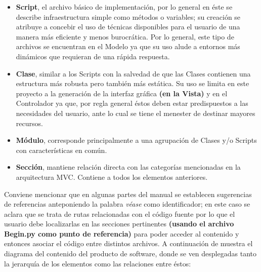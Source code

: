 \documentclass[12pt,twoside]{article}
\begin{document}
\begin{itemize}
\item \textbf{Script}, el archivo básico de implementación, por lo general en 
éste se describe infraestructura simple como métodos o variables; su creación 
se atribuye a concebir el uso de técnicas disponibles para el usuario de una 
manera más eficiente y menos burocrática.\break
Por lo general, este tipo de archivos se encuentran en el Modelo ya que su uso 
alude a entornos más dinámicos que requieran de una rápida respuesta.
\item \textbf{Clase}, similar a los Scripts con la salvedad de que las Clases 
contienen una estructura más robusta pero también más estática. Su uso se 
limita en este proyecto a la generación de la interfaz gráfica \textbf{(en la Vista)} 
y en el Controlador ya que, por regla general éstos deben estar predispuestos 
a las necesidades del usuario, ante lo cual se tiene el menester de destinar 
mayores recursos.
\item \textbf{Módulo}, corresponde principalmente a una agrupación de Clases 
y/o Scripts con características en común.
\item \textbf{Sección}, mantiene relación directa con las categorías mencionadas 
en la arquitectura MVC. Contiene a todos los elementos anteriores.\medskip\break
\end{itemize}

Conviene mencionar que en algunas partes del manual se establecen sugerencias 
de referencias anteponiendo la palabra \textit{véase} como identificador; en este 
caso se aclara que se trata de rutas relacionadas con el código fuente por lo que 
el usuario debe localizarlas en las secciones pertinentes \textbf{(usando el archivo 
Begin.py como punto de referencia)} para poder acceder al contenido y entonces 
asociar el código entre distintos archivos.\medskip\break
A continuación de muestra el diagrama del contenido del producto de software, 
donde se ven desplegadas tanto la jerarquía de los elementos como las 
relaciones entre éstos:
\end{document}
